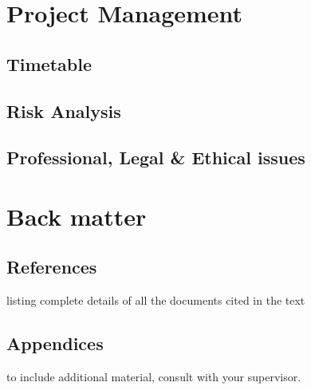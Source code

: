 \documentclass[11pt]{article}
\begin{document}
\section{Project Management}
\subsection{Timetable}

\subsection{Risk Analysis}

\subsection{Professional, Legal \& Ethical issues}

\section{Back matter}
\subsection{References}
listing complete details of all the documents cited in the text
\printbibliography

\subsection{Appendices}
to include additional material, consult with your supervisor.
\end{document}
